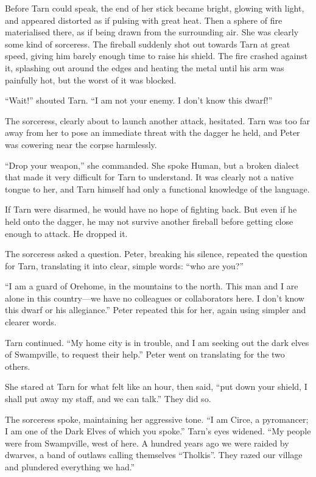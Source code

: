 Before Tarn could speak, the end of her stick became bright, glowing with light, and appeared distorted as if pulsing with great heat.  Then a sphere of fire materialised there, as if being drawn from the surrounding air.  She was clearly some kind of sorceress.  The fireball suddenly shot out towards Tarn at great speed, giving him barely enough time to raise his shield.  The fire crashed against it, splashing out around the edges and heating the metal until his arm was painfully hot, but the worst of it was blocked.

``Wait!'' shouted Tarn.  ``I am not your enemy.  I don't know this dwarf!''

The sorceress, clearly about to launch another attack, hesitated.  Tarn was too far away from her to pose an immediate threat with the dagger he held, and Peter was cowering near the corpse harmlessly.

``Drop your weapon,'' she commanded.  She spoke Human, but a broken dialect that made it very difficult for Tarn to understand. It was clearly not a native tongue to her, and Tarn himself had only a functional knowledge of the language.

If Tarn were disarmed, he would have no hope of fighting back.  But even if he held onto the dagger, he may not survive another fireball before getting close enough to attack.  He dropped it.

The sorceress asked a question.  Peter, breaking his silence, repeated the question for Tarn, translating it into clear, simple words: ``who are you?''

``I am a guard of Orehome, in the mountains to the north.  This man and I are alone in this country---we have no colleagues or collaborators here.  I don't know this dwarf or his allegiance.''  Peter repeated this for her, again using simpler and clearer words.

Tarn continued.  ``My home city is in trouble, and I am seeking out the dark elves of Swampville, to request their help.''  Peter went on translating for the two others.

She stared at Tarn for what felt like an hour, then said, ``put down your shield, I shall put away my staff, and we can talk.''  They did so.

The sorceress spoke, maintaining her aggressive tone.  ``I am Circe, a pyromancer; I am one of the Dark Elves of which you spoke.''  Tarn's eyes widened.  ``My people were from Swampville, west of here.  A hundred years ago we were raided by dwarves, a band of outlaws calling themselves ``Tholkis''.  They razed our village and plundered everything we had.''

